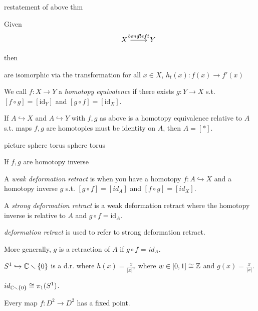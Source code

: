 \documentclass[11pt,leqno,oneside]{amsart}
\numberwithin{thm}{section}
\newcommand{\of}{\circ}
\newcommand{\minus}{\smallsetminus}
\newcommand{\fund}{\pi_1}
\newcommand{\into}{\hookrightarrow}
\newcommand{\id}{\text{id}}
\newcommand{\de}{\emph}
\begin{document}
\begin{thm}
  restatement of above thm

  Given
  $$\begin{tikzcd}
    &X \arrow[r, "f", "bend left"] &Y %
  \end{tikzcd}$$

  then



  are isomorphic via the transformation for all $x \in X$,
  $h_t(x)\colon f(x) \to f'(x)$
\end{thm}
\begin{defn}
  We call $f:X \to Y$ a \de{homotopy equivalence} if there exists
  $g\colon Y \to X$ s.t. $[f \of g] = [\id_Y]$ and
  $[g \of f] = [\id_X]$.
\end{defn}
\begin{rmk}
  If $A \into X$ and $A \into Y$ with $f,g$ as above is a homotopy
  equivalence relative to $A$ s.t. maps $f,g$ are homotopies must be
  identity on $A$, then $A = [*]$.

  picture sphere torus sphere torus

  If $f,g$ are homotopy inverse

\end{rmk}
\begin{defn}
  A \de{weak deformation retract} is when you have a homotopy
  $f: A \into X$ and a homotopy inverse $g$ s.t. $[g \of f] = [id_A]$
  and $[f \of g] = [id_X]$.
\end{defn}
\begin{defn}
  A \de{strong deformation retract} is a weak deformation retract
  where the homotopy inverse is relative to $A$ and $g \of f = \id_A$.
\end{defn}
\begin{rmk}
  \de{deformation retract} is used to refer to strong deformation
  retract.
\end{rmk}
\begin{rmk}
  More generally, $g$ is a retraction of $A$ if $g \of f$ = $id_A$.
\end{rmk}
\begin{example}
  $S^1 \into \C\minus\{0\}$ is a d.r. where $h(x) = \frac{x}{|x|^w}$
  where $w \in [0,1] \mathrel{\cong} {\mathbb Z}$ and $g(x) = \frac{x}{|x|}$.

  $id_{\C\minus\{0\}} \isom \fund(S^1)$.
\end{example}
\begin{thm}
  Every map $f\colon D^2 \to D^2$ has a fixed point.
\end{thm}
\end{document}
